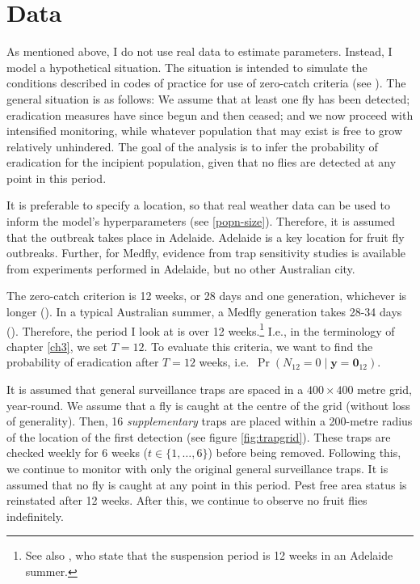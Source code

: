 \documentclass[
  oneside]{book}
\begin{document}
\hypertarget{data}{%
\section{Data}\label{data}}

As mentioned above, I do not use real data to estimate parameters. Instead, I model a hypothetical situation. The situation is intended to simulate the conditions described in codes of practice for use of zero-catch criteria (see \citet{supptraps}). The general situation is as follows: We assume that at least one fly has been detected; eradication measures have since begun and then ceased; and we now proceed with intensified monitoring, while whatever population that may exist is free to grow relatively unhindered. The goal of the analysis is to infer the probability of eradication for the incipient population, given that no flies are detected at any point in this period.

It is preferable to specify a location, so that real weather data can be used to inform the model's hyperparameters (see \ref{popn-size}). Therefore, it is assumed that the outbreak takes place in Adelaide. Adelaide is a key location for fruit fly outbreaks. Further, for Medfly, evidence from trap sensitivity studies is available from experiments performed in Adelaide, but no other Australian city.

The zero-catch criterion is 12 weeks, or 28 days and one generation, whichever is longer (\citet{meats2005}). In a typical Australian summer, a Medfly generation takes 28-34 days (\citet{dpirdwa}). Therefore, the period I look at is over 12 weeks.\footnote{See also \citet{pirsa}, who state that the suspension period is 12 weeks in an Adelaide summer.} I.e., in the terminology of chapter \ref{ch3}, we set \(T = 12\). To evaluate this criteria, we want to find the probability of eradication after \(T=12\) weeks, i.e.~\(\Pr(N_{12} = 0 \mid \mathbf y = \mathbf 0_{12})\).

It is assumed that general surveillance traps are spaced in a \(400 \times 400\) metre grid, year-round. We assume that a fly is caught at the centre of the grid (without loss of generality). Then, 16 \emph{supplementary} traps are placed within a 200-metre radius of the location of the first detection (see figure \ref{fig:trapgrid}). These traps are checked weekly for 6 weeks (\(t \in \{1, \ldots, 6\}\)) before being removed. Following this, we continue to monitor with only the original general surveillance traps. It is assumed that no fly is caught at any point in this period. Pest free area status is reinstated after 12 weeks. After this, we continue to observe no fruit flies indefinitely.
\end{document}
